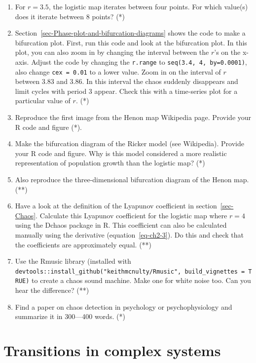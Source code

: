 \documentclass[
  a4paper,
  DIV=11,
  numbers=noendperiod,
  oneside]{scrreprt}
\begin{document}
\begin{enumerate}
\def\labelenumi{\arabic{enumi})}
\item
  For \(r=3.5\), the logistic map iterates between four points. For
  which value(s) does it iterate between 8 points? (*)
\item
  Section~\ref{sec-Phase-plot-and-bifurcation-diagrams} shows the code
  to make a bifurcation plot. First, run this code and look at the
  bifurcation plot. In this plot, you can also zoom in by changing the
  interval between the \(r\)'s on the x-axis. Adjust the code by
  changing the \texttt{r.range} to \texttt{seq(3.4,\ 4,\ by=0.0001)},
  also change \texttt{cex\ =\ 0.01} to a lower value. Zoom in on the
  interval of \(r\) between 3.83 and 3.86. In this interval the chaos
  suddenly disappears and limit cycles with period 3 appear. Check this
  with a time-series plot for a particular value of \(r\). (*)
\item
  Reproduce the first image from the Henon map Wikipedia page. Provide
  your R code and figure (*).
\item
  Make the bifurcation diagram of the Ricker model (see Wikipedia).
  Provide your R code and figure. Why is this model considered a more
  realistic representation of population growth than the logistic map?
  (*)
\item
  Also reproduce the three-dimensional bifurcation diagram of the Henon
  map. (**)
\item
  Have a look at the definition of the Lyapunov coefficient in
  section~\ref{sec-Chaos}. Calculate this Lyapunov coefficient for the
  logistic map where \(r = 4\) using the Dchaos package in R. This
  coefficient can also be calculated manually using the derivative
  (equation~\ref{eq-ch2-3}). Do this and check that the coefficients are
  approximately equal. (**)
\item
  Use the Rmusic library (installed with\\
  \texttt{devtools::install\_github("keithmcnulty/Rmusic",\ build\_vignettes\ =\ TRUE)}
  to create a chaos sound machine. Make one for white noise too. Can you
  hear the difference? (**)
\item
  Find a paper on chaos detection in psychology or psychophysiology and
  summarize it in 300---400 words. (*)
\end{enumerate}


\chapter{Transitions in complex systems}\label{sec-ch3}
\end{document}
